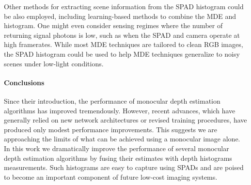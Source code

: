 Other methods for extracting scene information from the SPAD histogram could be
also employed, including learning-based methods to combine the MDE and
histogram. One might even consider sensing regimes where the number of
returning signal photons is low, such as when the SPAD and camera operate
at high framerates. While most MDE techniques are tailored to clean RGB images,  
the SPAD histogram could be used to help MDE
techniques generalize to noisy scenes under low-light conditions. 
 


\paragraph{Conclusions}
Since their introduction, the performance of monocular depth estimation algorithms has improved tremendously.  However, recent advances, which have generally relied on new network architectures or revised training procedures, have produced only modest performance improvements. 
This suggests we are approaching the limits of what can be achieved using a monocular image alone. 
In this work we dramatically improve the performance of several monocular depth estimation algorithms by fusing their estimates with depth histograms measurements. 
Such histograms are easy to capture using SPADs and are poised to become an important component of future low-cost imaging systems.
 

